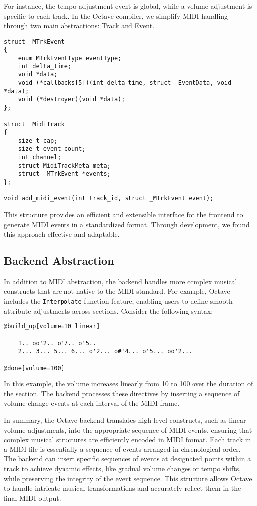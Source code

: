 \documentclass[letterpaper,12pt]{article}
\begin{document}
For instance, the tempo adjustment event is global, while a volume adjustment is specific to each track. In the Octave compiler, we simplify MIDI handling through two main abstractions: Track and Event.

\begin{verbatim}
struct _MTrkEvent
{
    enum MTrkEventType eventType;
    int delta_time;
    void *data;
    void (*callbacks[5])(int delta_time, struct _EventData, void *data);
    void (*destroyer)(void *data);
};

struct _MidiTrack
{
    size_t cap;
    size_t event_count;
    int channel;
    struct MidiTrackMeta meta;
    struct _MTrkEvent *events;
};

void add_midi_event(int track_id, struct _MTrkEvent event);
\end{verbatim}

This structure provides an efficient and extensible interface for the frontend to generate MIDI events in a standardized format. Through development, we found this approach effective and adaptable.

\subsection{Backend Abstraction}

In addition to MIDI abstraction, the backend handles more complex musical constructs that are not native to the MIDI standard. For example, Octave includes the \texttt{Interpolate} function feature, enabling users to define smooth attribute adjustments across sections. Consider the following syntax:

\begin{verbatim}
@build_up[volume=10 linear]

    1.. oo'2.. o'7.. o'5.. 
    2... 3... 5... 6... o'2... o#'4... o'5... oo'2...

@done[volume=100]
\end{verbatim}

In this example, the volume increases linearly from 10 to 100 over the duration of the section. The backend processes these directives by inserting a sequence of volume change events at each interval of the MIDI frame.

In summary, the Octave backend translates high-level constructs, such as linear volume adjustments, into the appropriate sequence of MIDI events, ensuring that complex musical structures are efficiently encoded in MIDI format. Each track in a MIDI file is essentially a sequence of events arranged in chronological order. The backend can insert specific sequences of events at designated points within a track to achieve dynamic effects, like gradual volume changes or tempo shifts, while preserving the integrity of the event sequence. This structure allows Octave to handle intricate musical transformations and accurately reflect them in the final MIDI output.
\end{document}
